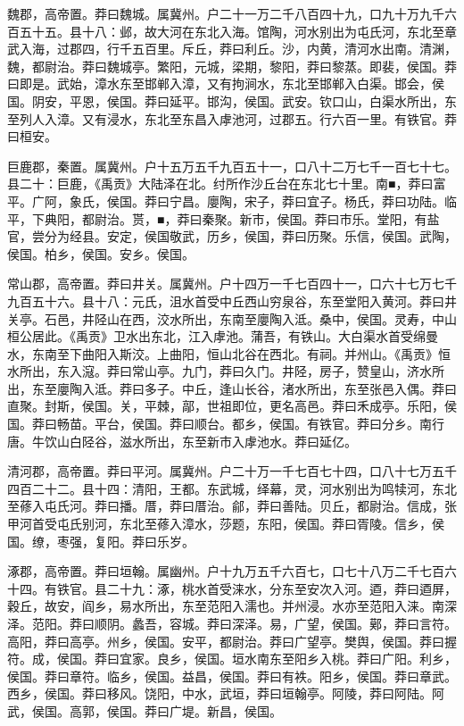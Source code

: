 \documentclass[]{article}
\begin{document}
魏郡，高帝置。莽曰魏城。属冀州。户二十一万二千八百四十九，口九十万九千六百五十五。县十八：邺，故大河在东北入海。馆陶，河水别出为屯氏河，东北至章武入海，过郡四，行千五百里。斥丘，莽曰利丘。沙，内黄，清河水出南。清渊，魏，都尉治。莽曰魏城亭。繁阳，元城，梁期，黎阳，莽曰黎蒸。即裴，侯国。莽曰即是。武始，漳水东至邯郸入漳，又有拘涧水，东北至邯郸入白渠。邯会，侯国。阴安，平恩，侯国。莽曰延平。邯沟，侯国。武安。钦口山，白渠水所出，东至列人入漳。又有浸水，东北至东昌入虖池河，过郡五。行六百一里。有铁官。莽曰桓安。

巨鹿郡，秦置。属冀州。户十五万五千九百五十一，口八十二万七千一百七十七。县二十：巨鹿，《禹贡》大陆泽在北。纣所作沙丘台在东北七十里。南■，莽曰富平。广阿，象氏，侯国。莽曰宁昌。廮陶，宋子，莽曰宜子。杨氏，莽曰功陆。临平，下典阳，都尉治。贳，■，莽曰秦聚。新市，侯国。莽曰市乐。堂阳，有盐官，尝分为经县。安定，侯国敬武，历乡，侯国，莽曰历聚。乐信，侯国。武陶，侯国。柏乡，侯国。安乡。侯国。

常山郡，高帝置。莽曰井关。属冀州。户十四万一千七百四十一，口六十七万七千九百五十六。县十八：元氏，沮水首受中丘西山穷泉谷，东至堂阳入黄河。莽曰井关亭。石邑，井陉山在西，洨水所出，东南至廮陶入泜。桑中，侯国。灵寿，中山桓公居此。《禹贡》卫水出东北，江入虖池。蒲吾，有铁山。大白渠水首受绵曼水，东南至下曲阳入斯洨。上曲阳，恒山北谷在西北。有祠。并州山。《禹贡》恒水所出，东入滱。莽曰常山亭。九门，莽曰久门。井陉，房子，赞皇山，济水所出，东至廮陶入泜。莽曰多子。中丘，逢山长谷，渚水所出，东至张邑入偶。莽曰直聚。封斯，侯国。关，平棘，鄗，世祖即位，更名高邑。莽曰禾成亭。乐阳，侯国。莽曰畅苗。平台，侯国。莽曰顺台。都乡，侯国。有铁官。莽曰分乡。南行唐。牛饮山白陉谷，滋水所出，东至新市入虖池水。莽曰延亿。

清河郡，高帝置。莽曰平河。属冀州。户二十万一千七百七十四，口八十七万五千四百二十二。县十四：清阳，王都。东武城，绎幕，灵，河水别出为鸣犊河，东北至蓚入屯氏河。莽曰播。厝，莽曰厝治。鄃，莽曰善陆。贝丘，都尉治。信成，张甲河首受屯氏别河，东北至蓚入漳水，莎题，东阳，侯国。莽曰胥陵。信乡，侯国。缭，枣强，复阳。莽曰乐岁。

涿郡，高帝置。莽曰垣翰。属幽州。户十九万五千六百七，口七十八万二千七百六十四。有铁官。县二十九：涿，桃水首受涞水，分东至安次入河。逎，莽曰逎屏，穀丘，故安，阎乡，易水所出，东至范阳入濡也。并州浸。水亦至范阳入涞。南深泽。范阳。莽曰顺阴。蠡吾，容城。莽曰深泽。易，广望，侯国。鄚，莽曰言符。高阳，莽曰高亭。州乡，侯国。安平，都尉治。莽曰广望亭。樊舆，侯国。莽曰握符。成，侯国。莽曰宜家。良乡，侯国。垣水南东至阳乡入桃。莽曰广阳。利乡，侯国。莽曰章符。临乡，侯国。益昌，侯国。莽曰有袟。阳乡，侯国。莽曰章武。西乡，侯国。莽曰移风。饶阳，中水，武垣，莽曰垣翰亭。阿陵，莽曰阿陆。阿武，侯国。高郭，侯国。莽曰广堤。新昌，侯国。
\end{document}
